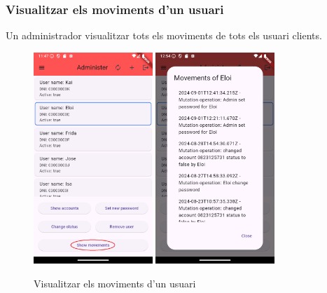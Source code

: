 \documentclass[a4paper,12pt,twoside]{ThesisStyle}
\begin{document}
\clearpage
\subsubsection{Visualitzar els moviments d'un usuari}
\label{subsubsec: Visualitzar els moviments d'un usuari}


Un administrador visualitzar tots els moviments de tots els usuari clients.

\begin{figure}[h]
    \centering
    \includegraphics[width=0.4\textwidth]{imatges/mainAdmin5.png}
    \includegraphics[width=0.4\textwidth]{imatges/movements.png}
    \caption{Visualitzar els moviments d'un usuari}
    \label{fig: Visualitzar els moviments d'un usuari}
\end{figure}
\end{document}
